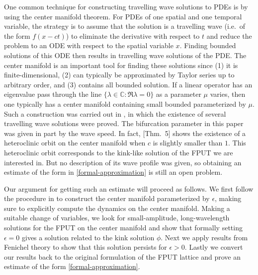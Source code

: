 One common technique for constructing travelling wave solutions to PDEs is by using the center manifold theorem. For PDEs of one spatial and one temporal variable, the strategy is to assume that the solution is a travelling wave (i.e.\ of the form \(f(x-ct)\)) to eliminate the derivative with respect to \(t\) and reduce the problem to an ODE with respect to the spatial variable \(x\). Finding bounded solutions of this ODE then results in travelling wave solutions of the PDE. The center manifold is an important tool for finding these solutions since (1) it is finite-dimensional, (2) can typically be approximated by Taylor series up to arbitrary order, and (3) contains all bounded solution. If a linear operator has an eigenvalue pass through the line \(\{\lambda\in\mathbb C: \Re \lambda = 0\}\) as a parameter \(\mu\) varies, then one typically has a center manifold containing small bounded parameterized by \(\mu\). Such a construction was carried out in \cite{iooss2000travelling}, in which the existence of several travelling wave solutions were proved. The bifurcation parameter in this paper was given in part by the wave speed. In fact, [Thm.\ 5]\cite{iooss2000travelling} shows the existence of a heteroclinic orbit on the center manifold when \(c\) is slightly smaller than \(1\). This heteroclinic orbit corresponds to the kink-like solution of the FPUT we are interested in. But no description of its wave profile was given, so obtaining an estimate of the form in \cref{formal-approximation} is still an open problem.


Our argument for getting such an estimate will proceed as follows. We first follow the procedure in \cite{iooss2000travelling}
to construct the center manifold parameterized by \(\epsilon\), making sure to explicitly compute the dynamics on the center manifold. Making a suitable change of variables, we look for small-amplitude, long-wavelength solutions for the FPUT on the center manifold and show that formally setting \(\epsilon = 0\) gives a solution related to the kink solution \(\phi\). Next we apply results from Fenichel theory to show that this solution persists for \(\epsilon> 0\). Lastly we convert our results back to the original formulation of the FPUT lattice and prove an estimate of the form \cref{formal-approximation}.

